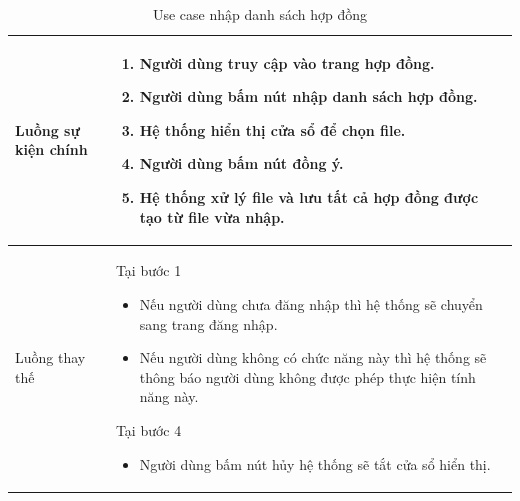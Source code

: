 \documentclass[12pt,a4paper]{article}
\begin{document}
\begin{table}[H]
\begin{tabular}{|p{3.5cm}|p{11.5cm}|c|}
            Luồng sự kiện chính & \vspace{-.8cm}\begin{enumerate}
                                                    \item Người dùng truy cập vào trang hợp đồng.
                                                    \item Người dùng bấm nút nhập danh sách hợp đồng.
                                                    \item Hệ thống hiển thị cửa sổ để chọn file.
                                                    \item Người dùng bấm nút đồng ý.
                                                    \item Hệ thống xử lý file và lưu tất cả hợp đồng được tạo từ file vừa nhập.
            \end{enumerate}
            \\
            \hline
            Luồng thay thế & Tại bước 1\newline
            \vspace{-.8cm}\begin{itemize}
                              \item Nếu người dùng chưa đăng nhập thì hệ thống sẽ chuyển sang trang đăng nhập.
                              \item Nếu người dùng không có chức năng này thì hệ thống sẽ thông báo người dùng không được phép thực hiện tính năng này.
            \end{itemize}
            Tại bước 4\newline
            \vspace{-.8cm}\begin{itemize}
                              \item Người dùng bấm nút hủy hệ thống sẽ tắt cửa sổ hiển thị.
            \end{itemize}
            \\ \hline
        \end{tabular}
        \caption{Use case nhập danh sách hợp đồng}

    \end{table}

\end{document}
